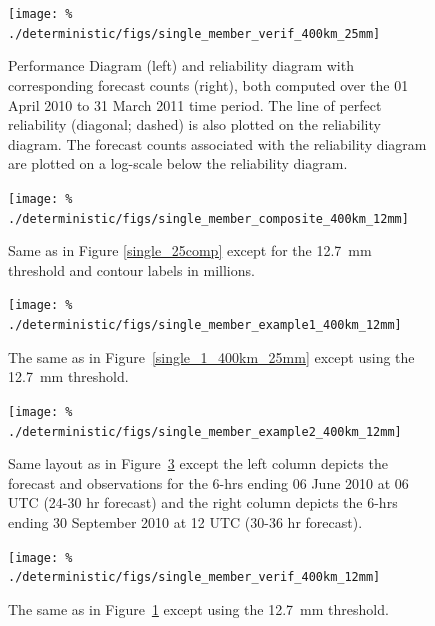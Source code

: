 \clearpage
\begin{figure}[cc]
    \centering
    \texttt{[image: \%
    ./deterministic/figs/single\_member\_verif\_400km\_25mm]}\\
    \caption{Performance Diagram (left) and reliability diagram with corresponding forecast counts (right), both computed over the 01 April 2010 to 31 March 2011 time period.
    The line of perfect reliability (diagonal; dashed) is also plotted on the reliability diagram.
    The forecast counts associated with the reliability diagram are plotted on a log-scale below the reliability diagram.}
    \label{single_verif_400km_25mm}
\end{figure}


\clearpage
\begin{figure}[cc]
    \centering
    \texttt{[image: \%
    ./deterministic/figs/single\_member\_composite\_400km\_12mm]}\\
    \caption{Same as in Figure \ref{single_25comp} except for the \mbox{12.7 mm} threshold and contour labels in millions.}

    \label{single_12comp}
\end{figure}


\clearpage
\begin{figure}[cc]
    \centering
    \texttt{[image: \%
    ./deterministic/figs/single\_member\_example1\_400km\_12mm]}\\
    \caption{The same as in \mbox{Figure \ref{single_1_400km_25mm}} except using the \mbox{12.7 mm} threshold.}
    \label{single_1_400km_12mm}
\end{figure}


\clearpage
\begin{figure}[cc]
    \centering
    \texttt{[image: \%
    ./deterministic/figs/single\_member\_example2\_400km\_12mm]}\\
    \caption{Same layout as in \mbox{Figure \ref{single_1_400km_12mm}} except the left column depicts the forecast and observations for the 6-hrs ending 06 June 2010 at 06 UTC (24-30 hr forecast) and the right column depicts the 6-hrs ending 30 September 2010 at 12 UTC (30-36 hr forecast).}
    \label{single_2_400km_12mm}
\end{figure}


\clearpage
\begin{figure}[cc]
    \centering
    \texttt{[image: \%
    ./deterministic/figs/single\_member\_verif\_400km\_12mm]}\\
    \caption{The same as in \mbox{Figure \ref{single_verif_400km_25mm}} except using the \mbox{12.7 mm} threshold.}
    \label{single_verif_400km_12mm}
\end{figure}





